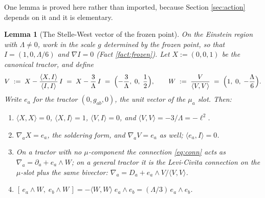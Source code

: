 \documentclass[11pt]{article}
\newtheorem{lemma}[theorem]{Lemma}
\theoremstyle{definition}
\newcommand{\ip}[2]{\langle #1, #2\rangle}
\begin{document}
One lemma is proved here rather than imported, because Section \ref{sec:action} depends on it and it is elementary.

\begin{lemma}[The Stelle-West vector of the frozen point]\label{lem:sw}
On the Einstein region with $\Lambda \neq 0$, work in the scale $g$ determined by the frozen point, so that $I = (1, 0, \Lambda/6)$ and $\nabla I = 0$ (Fact \ref{fact:frozen}). Let $X := (0, 0, 1)$ be the canonical tractor, and define
\[
V \;:=\; X - \frac{\ip{X}{I}}{\ip{I}{I}}\, I \;=\; X - \frac{3}{\Lambda}\, I \;=\; \Bigl(-\frac{3}{\Lambda},\; 0,\; \frac12\Bigr),
\qquad
W \;:=\; \frac{V}{\ip{V}{V}} \;=\; \Bigl(1,\; 0,\; -\frac{\Lambda}{6}\Bigr).
\]
Write $e_a$ for the tractor $(0, g_{ab}, 0)$, the unit vector of the $\mu_a$ slot. Then:
\begin{enumerate}
\item[(i)] $\ip{X}{X} = 0$, $\ip{X}{I} = 1$, $\ip{V}{I} = 0$, and $\ip{V}{V} = -3/\Lambda = -\ell^2$.
\item[(ii)] $\nabla_a X = e_a$, the soldering form, and $\nabla_a V = e_a$ as well; $\ip{e_a}{I} = 0$.
\item[(iii)] On a tractor with no $\mu$-component the connection \eqref{eq:conn} acts as $\nabla_a = \partial_a + e_a\wedge W$; on a general tractor it is the Levi-Civita connection on the $\mu$-slot plus the same bivector: $\nabla_a = D_a + e_a\wedge V/\ip{V}{V}$.
\item[(iv)] $[\,e_a\wedge W,\; e_b\wedge W\,] = -\ip{W}{W}\; e_a\wedge e_b = (\Lambda/3)\, e_a\wedge e_b$.
\end{enumerate}
\end{lemma}
\end{document}
